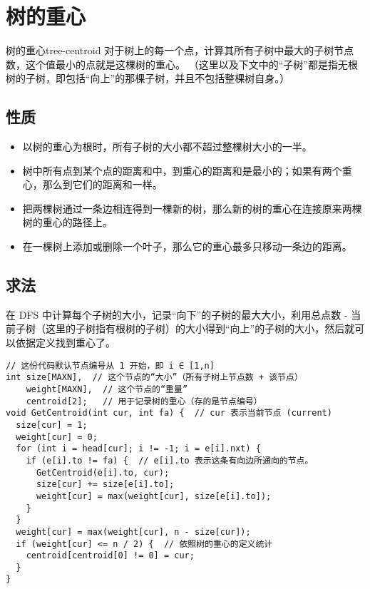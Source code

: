 \section{树的重心}
\begin{definition}{树的重心}{tree-centroid}
	对于树上的每一个点，计算其所有子树中最大的子树节点数，这个值最小的点就是这棵树的重心。
	（这里以及下文中的“子树”都是指无根树的子树，即包括“向上”的那棵子树，并且不包括整棵树自身。）
\end{definition}

\subsection{性质}
\begin{itemize}
	\item 以树的重心为根时，所有子树的大小都不超过整棵树大小的一半。
	\item 树中所有点到某个点的距离和中，到重心的距离和是最小的；如果有两个重心，那么到它们的距离和一样。
	\item 把两棵树通过一条边相连得到一棵新的树，那么新的树的重心在连接原来两棵树的重心的路径上。
	\item 在一棵树上添加或删除一个叶子，那么它的重心最多只移动一条边的距离。
\end{itemize}

\subsection{求法}
在 DFS 中计算每个子树的大小，记录“向下”的子树的最大大小，利用总点数 - 当前子树（这里的子树指有根树的子树）的大小得到“向上”的子树的大小，然后就可以依据定义找到重心了。

\begin{lstlisting}
// 这份代码默认节点编号从 1 开始，即 i ∈ [1,n]
int size[MAXN],  // 这个节点的“大小”（所有子树上节点数 + 该节点）
    weight[MAXN],  // 这个节点的“重量”
    centroid[2];   // 用于记录树的重心（存的是节点编号）
void GetCentroid(int cur, int fa) {  // cur 表示当前节点 (current)
  size[cur] = 1;
  weight[cur] = 0;
  for (int i = head[cur]; i != -1; i = e[i].nxt) {
    if (e[i].to != fa) {  // e[i].to 表示这条有向边所通向的节点。
      GetCentroid(e[i].to, cur);
      size[cur] += size[e[i].to];
      weight[cur] = max(weight[cur], size[e[i].to]);
    }
  }
  weight[cur] = max(weight[cur], n - size[cur]);
  if (weight[cur] <= n / 2) {  // 依照树的重心的定义统计
    centroid[centroid[0] != 0] = cur;
  }
}\end{lstlisting}